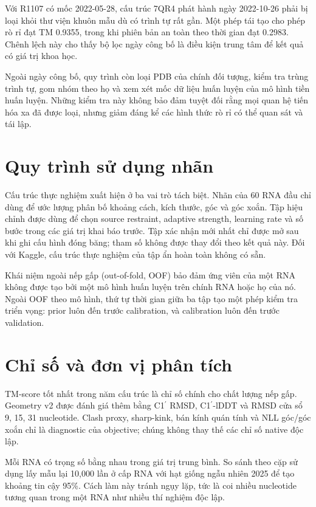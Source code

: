 \documentclass[12pt,a4paper,oneside]{report}
\newcommand{\cprime}{C1$^{\prime}$}
\begin{document}
Với R1107 có mốc 2022-05-28, cấu trúc 7QR4 phát hành ngày 2022-10-26 phải bị loại khỏi
thư viện khuôn mẫu dù có trình tự rất gần. Một phép tái tạo cho phép rò rỉ đạt TM 0.9355,
trong khi phiên bản an toàn theo thời gian đạt 0.2983. Chênh lệch này cho thấy bộ lọc
ngày công bố là điều kiện trung tâm để kết quả có giá trị khoa học.

Ngoài ngày công bố, quy trình còn loại PDB của chính đối tượng, kiểm tra trùng trình tự,
gom nhóm theo họ và xem xét mốc dữ liệu huấn luyện của mô hình tiền huấn luyện. Những
kiểm tra này không bảo đảm tuyệt đối rằng mọi quan hệ tiến hóa xa đã được loại, nhưng
giảm đáng kể các hình thức rò rỉ có thể quan sát và tái lập.

\section{Quy trình sử dụng nhãn}

Cấu trúc thực nghiệm xuất hiện ở ba vai trò tách biệt. Nhãn của 60 RNA đầu chỉ dùng để
ước lượng phân bố khoảng cách, kích thước, góc và góc xoắn. Tập hiệu chỉnh được dùng để
chọn source restraint, adaptive strength, learning rate và số bước trong các giá trị
khai báo trước. Tập xác nhận mới nhất chỉ được mở sau khi ghi cấu hình đóng băng; tham
số không được thay đổi theo kết quả này. Đối với Kaggle, cấu trúc thực nghiệm của tập
ẩn hoàn toàn không có sẵn.

Khái niệm ngoài nếp gấp (out-of-fold, OOF) bảo đảm ứng viên của một RNA không được tạo
bởi một mô hình huấn luyện trên chính RNA hoặc họ của nó. Ngoài OOF theo mô hình, thứ tự
thời gian giữa ba tập tạo một phép kiểm tra triển vọng: prior luôn đến trước calibration,
và calibration luôn đến trước validation.

\section{Chỉ số và đơn vị phân tích}

TM-score tốt nhất trong năm cấu trúc là chỉ số chính cho chất lượng nếp gấp. Geometry
v2 được đánh giá thêm bằng \cprime{} RMSD, \cprime{}-lDDT và RMSD cửa sổ 9, 15, 31
nucleotide. Clash proxy, sharp-kink, bán kính quán tính và NLL góc/góc xoắn chỉ là
diagnostic của objective; chúng không thay thế các chỉ số native độc lập.

Mỗi RNA có trọng số bằng nhau trong giá trị trung bình. So sánh theo cặp sử dụng
lấy mẫu lại 10,000 lần ở cấp RNA với hạt giống ngẫu nhiên 2025 để tạo khoảng tin cậy
95\%. Cách làm này
tránh ngụy lặp, tức là coi nhiều nucleotide tương quan trong một RNA như nhiều thí
nghiệm độc lập.
\end{document}
